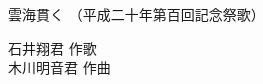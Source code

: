 \documentclass[10pt,b5j]{tarticle} %
\begin{document}
\begin{minipage}[c]{0.7\hsize} %
    \begin{center}
        {\LARGE
            雲海貫く %
        }
        {\small 
            （平成二十年第百回記念祭歌） %
        }
    \end{center}
\end{minipage}
\begin{minipage}[c]{0.3\hsize} %
    \begin{flushright} %
        石井翔君 作歌\\木川明音君 作曲 %
    \end{flushright}
\end{minipage}
\end{document}
